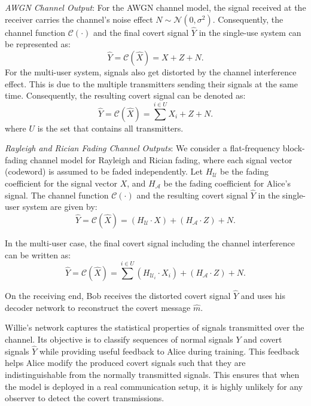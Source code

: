 \textit{AWGN Channel Output}: For the AWGN channel model, the signal received at the receiver carries the channel's noise effect \(N \sim \mathcal{N}(0, \sigma^2)\). Consequently, the channel function \(\mathcal{C}(\cdot)\) and the final covert signal \(\hat{Y}\) in the single-use system can be represented as:
\begin{equation}
	\hat{Y} = \mathcal{C}(\hat{X}) = X + Z + N.
\end{equation}
For the multi-user system, signals also get distorted by the channel interference effect. This is due to the multiple transmitters sending their signals at the same time. Consequently, the resulting covert signal can be denoted as:
\begin{equation}
	 \hat{Y} = \mathcal{C}(\hat{X}) = \sum^{i \in U}X_i + Z + N.
\end{equation}
where \(U\) is the set that contains all transmitters.

\textit{Rayleigh and Rician Fading Channel Outputs}: We consider a flat-frequency block-fading channel model for Rayleigh and Rician fading, where each signal vector (codeword) is assumed to be faded independently. Let \(H_{\mathcal{U}}\) be the fading coefficient for the signal vector \(X\), and \(H_{\mathcal{A}}\) be the fading coefficient for Alice's signal. The channel function \(\mathcal{C}(\cdot)\) and the resulting covert signal \(\hat{Y}\) in the single-user system are given by:
\begin{equation}
	\hat{Y} = \mathcal{C}(\hat{X}) = (H_{\mathcal{U}} \cdot X) + (H_{\mathcal{A}} \cdot Z) + N.
\end{equation}

In the multi-user case, the final covert signal including the channel interference can be written as:
\begin{equation}
	\hat{Y} = \mathcal{C}(\hat{X}) = \sum^{i \in U}(H_{\mathcal{U}_i} \cdot X_i) + (H_{\mathcal{A}} \cdot Z) + N.
\end{equation}

On the receiving end, Bob receives the distorted covert signal \(\hat{Y}\) and uses his decoder network to reconstruct the covert message \(\hat{m}\).

Willie's network captures the statistical properties of signals transmitted over the channel. Its objective is to classify sequences of normal signals \(Y\) and covert signals \(\hat{Y}\) while providing useful feedback to Alice during training. This feedback helps Alice modify the produced covert signals such that they are indistinguishable from the normally transmitted signals. This ensures that when the model is deployed in a real communication setup, it is highly unlikely for any observer to detect the covert transmissions.

